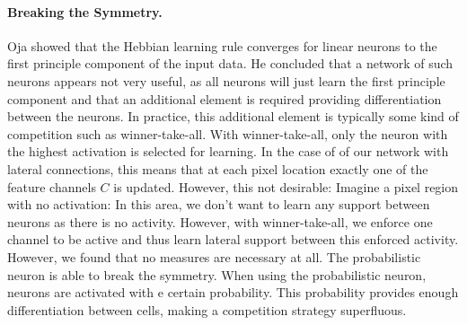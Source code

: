 \paragraph{Breaking the Symmetry.}  Oja \cite{Oja_1982} showed that the Hebbian learning rule converges for linear neurons to the first principle component of the input data. He concluded that a 
network of such neurons appears not very useful, as all neurons will just learn the first principle component and that an additional element is required providing differentiation between the neurons.
In practice, this additional element is typically some kind of competition such as winner-take-all. With winner-take-all, only the neuron with the highest activation is selected for learning. In the case of of our network with lateral connections, this means that at each pixel location exactly one of the feature channels $C$ is updated. However, this not desirable: Imagine a pixel region with no activation: In this area, we don't want to learn any support between neurons as there is no activity. However, with winner-take-all, we enforce one channel to be active and thus learn lateral support between this enforced activity. However, we found that no measures are necessary at all. The probabilistic neuron is able to break the symmetry. When using the probabilistic neuron, neurons are activated with e certain probability. This probability provides enough differentiation between cells, 
making a competition strategy superfluous.

